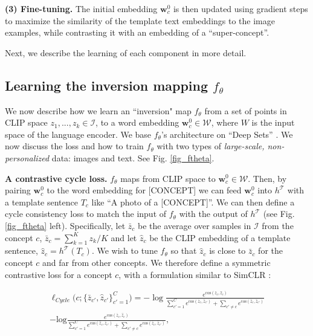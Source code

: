 \documentclass[runningheads]{llncs}
\newcommand{\figref}[1]{Fig. \ref{#1}}
\newcommand\edit[1]{#1}
\newcommand{\cossim}[2]{\text{cos}(#1, #2)}
\renewcommand\vec[1]{\mathbf{#1}}
\newcommand{\ftheta}{f_\theta}
\newcommand{\w}{\vec{w}}
\newcommand{\W}{\mathcal{W}}
\newcommand{\I}{\mathcal{I}}
\newcommand{\CLIPT}{h^{\mathcal{T}}}
\newcommand{\concept}{[CONCEPT]}
\begin{document}
\textbf{(3) Fine-tuning.} The initial embedding $\w_c^0$ is then updated using gradient steps \edit{to maximize the similarity of the template text embeddings to the image examples, while contrasting it with an embedding of a ``super-concept''.}

Next, we describe the learning of each component in more detail.



\subsection{Learning the inversion mapping $\ftheta$}

\label{learning_ftheta}
We now describe how we learn an ``inversion" map $\ftheta$ from a set of points in CLIP space $z_1,...,z_k \in \I$, to a word embedding $\w^0_c\in\W$, where $W$ is the input space of the language encoder.  We base $\ftheta$'s architecture on ``Deep Sets'' \cite{zaheer2017deep}.  We now discuss the loss and how to train $\ftheta$ with two types of \textit{large-scale, non-personalized} data: images and text. See \figref{fig_ftheta}.





\textbf{A contrastive cycle loss.}
\edit{$\ftheta$ maps from CLIP space to $\w^0_c\in\W$. Then, by pairing $\w^0_c$ to the word embedding for \concept{}
we can feed $\w^0_c$ into $\CLIPT$ with a template sentence $T_c$ like ``A photo of a \concept{}''. We can then define a cycle consistency loss to match the input of $\ftheta$ with the output of $\CLIPT$ (see \figref{fig_ftheta} left)}. Specifically, let $\bar{z}_c$ be the average over samples in $\I$ from the concept $c$, $\bar{z}_c = \sum_{k=1}^K{z_k}/K$ and let
$\hat{z}_c$ be the CLIP embedding of a template sentence, $\hat{z}_c = \CLIPT(T_c)$. We wish to tune $\ftheta$ so that $\hat{z}_c$ is close to $\bar{z}_c$ for the concept $c$ and far from other concepts. We therefore define a symmetric contrastive loss for a concept $c$, with a formulation similar to SimCLR \cite{chen2020simple}: 

\begin{equation} 
\begin{split}
\label{eq_total_loss}
    \ell_{Cycle}\big({c}; \{\bar{z}_{c'}, \hat{z}_{c'} \}_{c'=1}^{C} \big)  = -\log\frac{e^{\cossim{\bar{z}_{c}}{\hat{z}_{c}}}}{\sum_{c'=1}^{C} e^{\cossim{\bar{z}_{c}}{\hat{z}_{c'}}} + \sum_{c' \neq c} e^{\cossim{\hat{z}_{c}}{\hat{z}_{c'}}}} \\
      -\text{log}\frac{e^{\cossim{\bar{z}_{c}}{\hat{z}_{c}}}}{\sum_{c'=1}^{C} e^{\cossim{\hat{z}_{c}}{\bar{z}_{c'}}} + \sum_{c' \neq c} e^{\cossim{\bar{z}_{c}}{\bar{z}_{c'}}}},
\end{split}
\end{equation}
\end{document}
